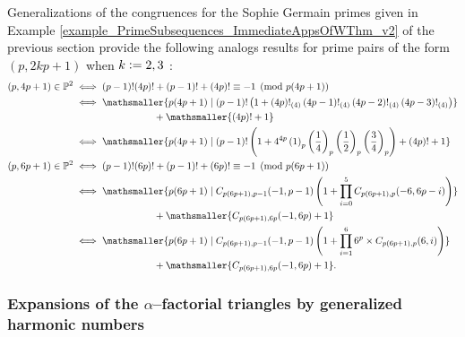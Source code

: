 \documentclass[12pt,reqno]{article}
\numberwithin{sfootnote}{section}
\numberwithin{equation}{section}
\theoremstyle{plain}
\theoremstyle{definition}
\theoremstyle{remark}
\newcommand{\defequals}{\ensuremath{\vcentcolon=}}
\newcommand{\Pochhammer}[2]{\ensuremath{\left(#1\right)_{#2}}}
\newcommand{\AlphaFactorial}[2]{\ensuremath{\left(#1\right)!_{\left(#2\right)}}}
\begin{document}
Generalizations of the congruences for the 
Sophie Germain primes given in 
Example \ref{example_PrimeSubsequences_ImmediateAppsOfWThm_v2} 
of the previous section provide the following analogs results for 
prime pairs of the form $(p, 2kp+1)$ when $k \defequals 2, 3$ 
\citep[\S 5.2]{PRIMEREC}: 
\begin{align*} 
\left(p, 4p+1\right) \in \mathbb{P}^{2} 
     & \iff 
     (p-1)! (4p)! + (p-1)! + (4p)! \equiv -1 \pmod{p(4p+1)} \\ 
     & \iff 
     \mathsmaller{ 
     p(4p+1) \mid (p-1)! \left(1 + 
     \AlphaFactorial{4p}{4} \AlphaFactorial{4p-1}{4} 
     \AlphaFactorial{4p-2}{4} \AlphaFactorial{4p-3}{4} 
     \right) 
     } \\ 
     & \phantom{\iff p(4p+1) \mid \quad} + 
     \mathsmaller{ 
     (4p)! + 1 
     } \\ 
     & \iff 
     \mathsmaller{ 
     p(4p+1) \mid (p-1)! \left(1 + 
     4^{4p} \Pochhammer{1}{p} \Pochhammer{\frac{1}{4}}{p} 
     \Pochhammer{\frac{1}{2}}{p} \Pochhammer{\frac{3}{4}}{p} 
     \right) + 
     (4p)! + 1 
     } \\ 
\left(p, 6p+1\right) \in \mathbb{P}^{2} 
     & \iff 
     (p-1)! (6p)! + (p-1)! + (6p)! \equiv -1 \pmod{p(6p+1)} \\ 
     & \iff 
     \mathsmaller{ 
     p(6p+1) \mid C_{p(6p+1),p-1}(-1, p-1) \left(1 + 
     \prod\limits_{i=0}^{5} C_{p(6p+1),p}(-6, 6p-i) \right) 
     } \\ 
     & \phantom{\iff p(6p+1) \mid \quad} + 
     \mathsmaller{ 
     C_{p(6p+1),6p}(-1, 6p) + 1 
     } \\ 
     & \iff 
     \mathsmaller{ 
     p(6p+1) \mid C_{p(6p+1),p-1}(-1, p-1) \left(1 + 
     \prod\limits_{i=1}^{6} 6^{p} \times C_{p(6p+1),p}(6, i) \right) 
     } \\ 
     & \phantom{\iff p(6p+1) \mid \quad} + 
     \mathsmaller{ 
     C_{p(6p+1),6p}(-1, 6p) + 1 
     }. 
\end{align*} 

\subsubsection{Expansions of the $\alpha$--factorial triangles by 
               generalized harmonic numbers} 
\end{document}
